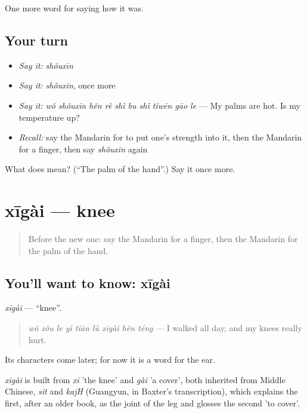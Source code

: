 \begin{grammarlens}[title={What you've built}]
One more word for saying how it was.
\end{grammarlens}

\subsection*{Your turn}
\begin{itemize}
\raggedright
  \item \emph{Say it:} \emph{shǒuxīn}
  \item \emph{Say it:} \emph{shǒuxīn}, once more
  \item \emph{Say it:} \emph{wǒ shǒuxīn hěn rè shì bu shì tǐwēn gāo le} — My palms are hot. Is my temperature up?
  \item \emph{Recall:} say the Mandarin for to put one's strength into it, then the Mandarin for a finger, then say \emph{shǒuxīn} again
\end{itemize}

\begin{tcolorbox}[breakable,colback=teal!4,colframe=teal!35!black,title={Before you move on}]
What does  mean? (\textquotedblleft{}The palm of the hand\textquotedblright{}.) Say it once more.
\end{tcolorbox}
\section[xīgài]{xīgài — knee}

\label{lesson:ZH-C475-xigai}



\begin{quote}
Before the new one: say the Mandarin for a finger, then the Mandarin for the palm of the hand.
\end{quote}

\subsection*{You'll want to know: xīgài}
\emph{xīgài} — \textquotedblleft{}knee\textquotedblright{}.

\begin{quote}
\emph{wǒ zǒu le yì tiān lù xīgài hěn téng} — I walked all day, and my knees really hurt.
\end{quote}

Its characters come later; for now it is a word for the ear.

\begin{cousinweb}
\emph{xīgài} is built from \emph{xī} 'the knee' and \emph{gài} 'a cover', both inherited from Middle Chinese, \emph{sit} and \emph{kajH} (Guangyun, in Baxter's transcription), which explains the first, after an older book, as the joint of the leg and glosses the second 'to cover'.
\end{cousinweb}

